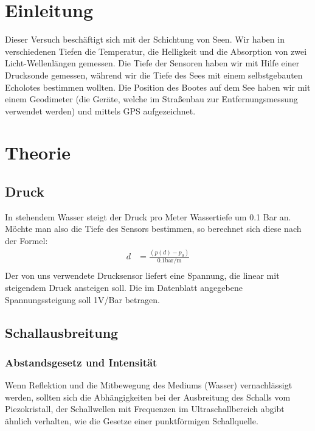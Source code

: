 \documentclass[12pt,a4paper,titlepage,headinclude,bibtotoc]{scrartcl}
\begin{document}
\setcounter{footnote}{0}
\setcounter{page}{1}
\section{Einleitung}
\label{sec:einleitung}
\cite{demtroeder}
Dieser Versuch beschäftigt sich mit der Schichtung von Seen.
Wir haben in verschiedenen Tiefen die Temperatur, die Helligkeit und die Absorption von zwei Licht-Wellenlängen gemessen.
Die Tiefe der Sensoren haben wir mit Hilfe einer Drucksonde gemessen, während wir die Tiefe des Sees mit einem selbstgebauten Echolotes bestimmen wollten.
Die Position des Bootes auf dem See haben wir mit einem Geodimeter (die Geräte, welche im Straßenbau zur Entfernungsmessung verwendet werden) und mittels GPS aufgezeichnet.


\section{Theorie}
\label{sec:theorie}
\subsection{Druck}
In stehendem Wasser steigt der Druck pro Meter Wassertiefe um 0.1 Bar an.
Möchte man also die Tiefe des Sensors bestimmen, so berechnet sich diese nach der Formel:
\begin{align}
	d&=\frac{(p(d)-p_0)}{0.1\si{\bar \per\metre}} \label{eq:d}\\
\end{align}
Der von uns verwendete Drucksensor liefert eine Spannung, die linear mit steigendem Druck ansteigen soll.
Die im Datenblatt angegebene Spannungssteigung soll 1V/Bar betragen.








\subsection{Schallausbreitung}

\subsubsection{Abstandsgesetz und Intensität}

Wenn Reflektion und die Mitbewegung des Mediums (Wasser) vernachlässigt werden, sollten sich die Abhängigkeiten bei der Ausbreitung des Schalls vom Piezokristall, der Schallwellen mit Frequenzen im Ultraschallbereich abgibt
ähnlich verhalten, wie die Gesetze einer punktförmigen Schallquelle. 
\end{document}
